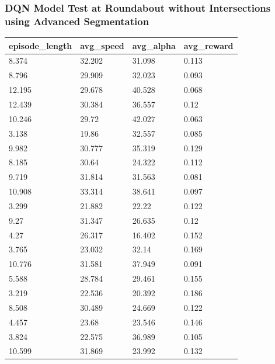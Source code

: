 \documentclass[conference]{IEEEtran}
\begin{document}
	\subsubsection{DQN Model Test at Roundabout without Intersections using Advanced Segmentation}
	\label{sec:pengujian_dqn_bundaran_nosimpang_segmentasi_hitam_putih}
	
	\begin{table}[H]
		\begin{tabular}{|l|l|l|l|}
			\hline
			episode\_length & avg\_speed  & avg\_alpha  & avg\_reward \\ \hline
			8.374           & 32.202 & 31.098 & 0.113  \\ \hline
			8.796           & 29.909 & 32.023 & 0.093  \\ \hline
			12.195          & 29.678 & 40.528 & 0.068  \\ \hline
			12.439          & 30.384 & 36.557 & 0.12   \\ \hline
			10.246          & 29.72  & 42.027 & 0.063  \\ \hline
			3.138           & 19.86  & 32.557 & 0.085  \\ \hline
			9.982           & 30.777 & 35.319 & 0.129  \\ \hline
			8.185           & 30.64  & 24.322 & 0.112  \\ \hline
			9.719           & 31.814 & 31.563 & 0.081  \\ \hline
			10.908          & 33.314 & 38.641 & 0.097  \\ \hline
			3.299           & 21.882 & 22.22  & 0.122  \\ \hline
			9.27            & 31.347 & 26.635 & 0.12   \\ \hline
			4.27            & 26.317 & 16.402 & 0.152  \\ \hline
			3.765           & 23.032 & 32.14  & 0.169  \\ \hline
			10.776          & 31.581 & 37.949 & 0.091  \\ \hline
			5.588           & 28.784 & 29.461 & 0.155  \\ \hline
			3.219           & 22.536 & 20.392 & 0.186  \\ \hline
			8.508           & 30.489 & 24.669 & 0.122  \\ \hline
			4.457           & 23.68  & 23.546 & 0.146  \\ \hline
			3.824           & 22.575 & 36.989 & 0.105  \\ \hline
			10.599          & 31.869 & 23.992 & 0.132  \\ \hline

\end{tabular}
\end{table}
\end{document}
